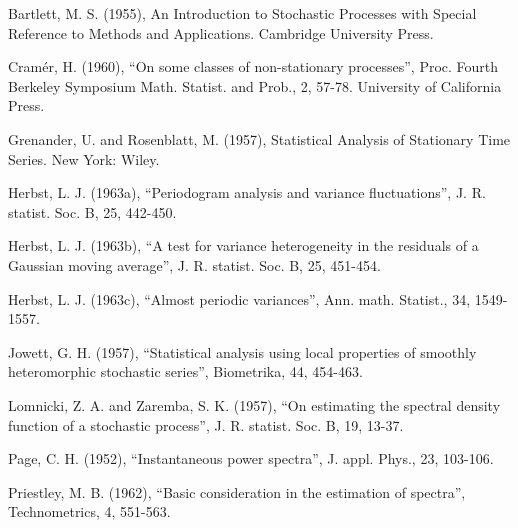 \documentclass{article}
\begin{document}
\begin{thebibliography}{99}
  {}Bartlett, M. S. (1955), An Introduction to
  Stochastic Processes with Special Reference to Methods and Applications.
  Cambridge University Press.
  
  {}Cram{\'e}r, H. (1960), ``On some classes of
  non-stationary processes'', Proc. Fourth Berkeley Symposium Math. Statist.
  and Prob., 2, 57-78. University of California Press.
  
  {}Grenander, U. and Rosenblatt, M. (1957),
  Statistical Analysis of Stationary Time Series. New York: Wiley.
  
  {}Herbst, L. J. (1963a), ``Periodogram analysis and
  variance fluctuations'', J. R. statist. Soc. B, 25, 442-450.
  
  {}Herbst, L. J. (1963b), ``A test for variance
  heterogeneity in the residuals of a Gaussian moving average'', J. R.
  statist. Soc. B, 25, 451-454.
  
  {}Herbst, L. J. (1963c), ``Almost periodic variances'',
  Ann. math. Statist., 34, 1549-1557.
  
  {}Jowett, G. H. (1957), ``Statistical analysis using
  local properties of smoothly heteromorphic stochastic series'', Biometrika,
  44, 454-463.
  
  {}Lomnicki, Z. A. and Zaremba, S. K. (1957), ``On
  estimating the spectral density function of a stochastic process'', J. R.
  statist. Soc. B, 19, 13-37.
  
  {}Page, C. H. (1952), ``Instantaneous power spectra'', J.
  appl. Phys., 23, 103-106.
  
  {}Priestley, M. B. (1962), ``Basic consideration in
  the estimation of spectra'', Technometrics, 4, 551-563.
\end{thebibliography}
\end{document}
